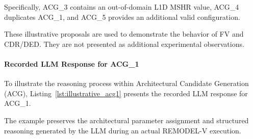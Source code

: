 Specifically, ACG\_3 contains an
out-of-domain L1D MSHR value, ACG\_4
duplicates ACG\_1, and ACG\_5 provides
an additional valid configuration.

These illustrative proposals are used
to demonstrate the behavior of FV and
CDR/DED. They are not presented as
additional experimental observations.



\paragraph{Recorded LLM Response for ACG\_1}
\label{app:illustrative_acg_reasoning}

To illustrate the reasoning process within
Architectural Candidate Generation (ACG),
Listing~\ref{lst:illustrative_acg1}
presents the recorded LLM response for ACG\_1.

The example preserves the architectural
parameter assignment and structured
reasoning generated by the LLM during
an actual REMODEL-V execution.

